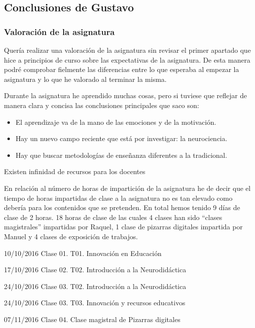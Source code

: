 

\subsection{Conclusiones de Gustavo}
\begin{leftbar}{\guscolor}
\subsubsection{Valoración de la asignatura}

Quería realizar una valoración de la asignatura sin revisar el primer apartado que hice a principios de curso sobre las expectativas de la asignatura. De esta manera podré comprobar fielmente las diferencias entre lo que esperaba al empezar la asignatura y lo que he valorado al terminar la misma.

Durante la asignatura he aprendido muchas cosas, pero si tuviese que reflejar de manera clara y concisa las conclusiones principales que saco son:

\begin{itemize}
\item El aprendizaje va de la mano de las emociones y de la motivación.
\item Hay un nuevo campo reciente que está por investigar: la neurociencia.
\item Hay que buscar metodologías de enseñanza diferentes a la tradicional.
\end{itemize}

Existen infinidad de recursos para los docentes

En relación al número de horas de impartición de la asignatura he de decir que el tiempo de horas impartidas de clase a la asignatura no es tan elevado como debería para los contenidos que se pretenden. En total hemos tenido 9 días de clase de 2 horas. 18 horas de clase de las cuales 4 clases han sido “clases magistrales” impartidas por Raquel, 1 clase de pizarras digitales impartida por Manuel y 4 clases de exposición de trabajos.

10/10/2016 Clase 01. T01. Innovación en Educación

17/10/2016 Clase 02. T02. Introducción a la Neurodidáctica

24/10/2016 Clase 03. T02. Introducción a la Neurodidáctica

24/10/2016 Clase 03. T03. Innovación y recursos educativos

07/11/2016 Clase 04. Clase magistral de Pizarras digitales


\end{leftbar}
